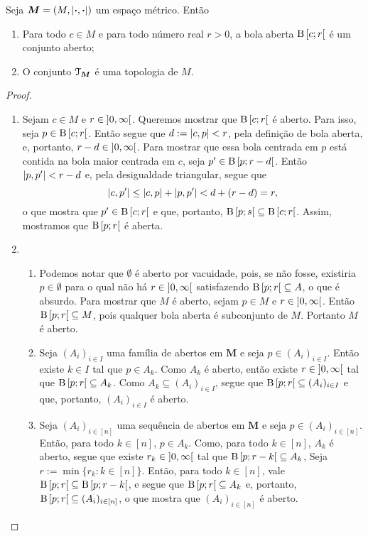 \begin{proposition}
Seja $\bm M = (M,\left\vert{\bm{\cdot}},{\bm{\cdot}}\right\vert)$ um espaço métrico. Então
	\begin{enumerate}
	\item Para todo $c \in M$ e para todo número real $r > 0$, a bola aberta $\mathrm{B}\left[{c};{r}\right[$ é um conjunto aberto;
	\item O conjunto $\mathcal{T}_{\bm M}$ é uma topologia de $M$.
	\end{enumerate}
\end{proposition}
\begin{proof}
	\begin{enumerate}
	\item Sejam $c \in M$ e $r \in \left]{0},{\infty}\right[$. Queremos mostrar que $\mathrm{B}\left[{c};{r}\right[$ é aberto. Para isso, seja $p \in \mathrm{B}\left[{c};{r}\right[$. Então segue que $d := \left\vert{c},{p}\right\vert < r$, pela definição de bola aberta, e, portanto, $r-d \in \left]{0},{\infty}\right[$. Para mostrar que essa bola centrada em $p$ está contida na bola maior centrada em $c$, seja $p' \in \mathrm{B}\left[{p};{r-d}\right[$. Então $\left\vert{p},{p'}\right\vert<r-d$ e, pela desigualdade triangular, segue que
	\begin{equation*}
	\left\vert{c},{p'}\right\vert \leq \left\vert{c},{p}\right\vert + \left\vert{p},{p'}\right\vert < d + (r-d) = r,
	\end{equation*}
o que mostra que $p' \in \mathrm{B}\left[{c};{r}\right[$ e que, portanto, $\mathrm{B}\left[{p};{s}\right[ \subseteq \mathrm{B}\left[{c};{r}\right[$. Assim, mostramos que $\mathrm{B}\left[{p};{r}\right[$ é aberta.
	
	\item
		\begin{enumerate}
		\item Podemos notar que $\emptyset$ é aberto por vacuidade, pois, se não fosse, existiria $p \in \emptyset$ para o qual não há $r \in \left]{0},{\infty}\right[$ satisfazendo $\mathrm{B}\left[{p};{r}\right[ \subseteq A$, o que é absurdo.
	Para mostrar que $M$ é aberto, sejam $p \in M$ e $r \in \left]{0},{\infty}\right[$. Então $\mathrm{B}\left[{p};{r}\right[ \subseteq M$, pois qualquer bola aberta é subconjunto de $M$. Portanto $M$ é aberto.
	
		\item Seja $(A_i)_{i \in I}$ uma família de abertos em $\bm M$ e seja $p \in (A_i)_{i \in I}$. Então existe $k \in I$ tal que $p \in A_k$. Como $A_k$ é aberto, então existe $r \in \left]{0},{\infty}\right[$ tal que $\mathrm{B}\left[{p};{r}\right[ \subseteq A_k$. Como $A_k \subseteq (A_i)_{i \in I}$, segue que $\mathrm{B}\left[{p};{r}\right[ \subseteq (A_i)_{i \in I}$ e que, portanto, $(A_i)_{i \in I}$ é aberto.
	
		\item Seja $(A_i)_{i \in [n]}$ uma sequência de abertos em $\bm M$ e seja $p \in (A_i)_{i \in [n]}$. Então, para todo $k \in [n]$, $p \in A_k$. Como, para todo $k \in [n]$, $A_k$ é aberto, segue que existe $r_k \in \left]{0},{\infty}\right[$ tal que $\mathrm{B}\left[{p};{r-k}\right[ \subseteq A_k$, Seja $r := \min \{r_k : k \in [n]\}$. Então, para todo $k \in [n]$, vale $\mathrm{B}\left[{p};{r}\right[ \subseteq \mathrm{B}\left[{p};{r-k}\right[$, e segue que $\mathrm{B}\left[{p};{r}\right[ \subseteq A_k$ e, portanto, $\mathrm{B}\left[{p};{r}\right[ \subseteq (A_i)_{i \in [n]}$, o que mostra que $(A_i)_{i \in [n]}$ é aberto.
		\end{enumerate}		
	\end{enumerate}
\end{proof}

